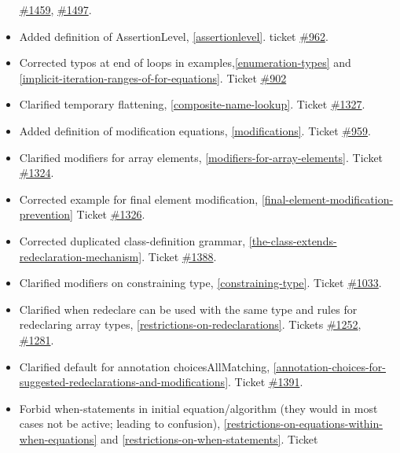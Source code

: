 \documentclass[../MLS.tex]{subfiles}
\begin{document}
\begin{itemize}
  \href{https://trac.modelica.org/Modelica/ticket/1459}{\#1459},
  \href{https://trac.modelica.org/Modelica/ticket/1497}{\#1497}.
\item
  Added definition of AssertionLevel, \autoref{assertionlevel}. ticket
  \href{https://trac.modelica.org/Modelica/ticket/962}{\#962}.
\item
  Corrected typos at end of loops in examples,\autoref{enumeration-types} and
  \autoref{implicit-iteration-ranges-of-for-equations}. Ticket
  \href{https://trac.modelica.org/Modelica/ticket/902}{\#902}
\item
  Clarified temporary flattening, \autoref{composite-name-lookup}. Ticket
  \href{https://trac.modelica.org/Modelica/ticket/1327}{\#1327}.
\item
  Added definition of modification equations, \autoref{modifications}. Ticket
  \href{https://trac.modelica.org/Modelica/ticket/959}{\#959}.
\item
  Clarified modifiers for array elements, \autoref{modifiers-for-array-elements}. Ticket
  \href{https://trac.modelica.org/Modelica/ticket/1324}{\#1324}.
\item
  Corrected example for final element modification, \autoref{final-element-modification-prevention}
  Ticket \href{https://trac.modelica.org/Modelica/ticket/1326}{\#1326}.
\item
  Corrected duplicated class-definition grammar, \autoref{the-class-extends-redeclaration-mechanism}. Ticket
  \href{https://trac.modelica.org/Modelica/ticket/1388}{\#1388}.
\item
  Clarified modifiers on constraining type, \autoref{constraining-type}. Ticket
  \href{https://trac.modelica.org/Modelica/ticket/1033}{\#1033}.
\item
  Clarified when redeclare can be used with the same type and rules for
  redeclaring array types, \autoref{restrictions-on-redeclarations}. Tickets
  \href{https://trac.modelica.org/Modelica/ticket/1252}{\#1252},
  \href{https://trac.modelica.org/Modelica/ticket/1281}{\#1281}.
\item
  Clarified default for annotation choicesAllMatching, \autoref{annotation-choices-for-suggested-redeclarations-and-modifications}.
  Ticket \href{https://trac.modelica.org/Modelica/ticket/1391}{\#1391}.
\item
  Forbid when-statements in initial equation/algorithm (they would in
  most cases not be active; leading to confusion), \autoref{restrictions-on-equations-within-when-equations} and
  \autoref{restrictions-on-when-statements}. Ticket

\end{itemize}
\end{document}
